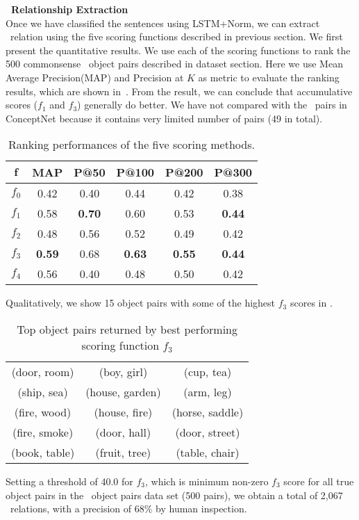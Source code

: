 \noindent
\textbf{\lnear\ Relationship Extraction}\\
Once we have classified the sentences using LSTM+Norm, we can extract \lnear\
relation using the five scoring functions described in previous section.
We first present the quantitative results. 
We use each of the scoring functions to 
rank the 500 commonsense \lnear\ object pairs described in dataset section. 
Here we use Mean Average Precision(MAP) and Precision at $K$ as metric 
to evaluate the ranking results, which are shown in~\tabref{tab:3m}.
From the result, we can conclude that accumulative scores ($f_1$ and $f_3$)
generally do better. We have not compared with the \lnear\ pairs in
ConceptNet because it contains very limited number of pairs (49 in total).
\begin{table}[th!]
\centering
\small
\begin{tabular}{|c|c|c|c|c|c|}
\hline
$\mathbf{f}$	& \textbf{MAP} & \textbf{P@50} & \textbf{P@100}  &  \textbf{P@200}& \textbf{P@300}\\ \hline \hline
	$f_0$ & 0.42 & 0.40 & 0.44 & 0.42 & 0.38 \\ \hline
	$f_1$	& 0.58  & {\bf 0.70} & 0.60& 0.53 & {\bf 0.44}\\\hline
	$f_2$	& 0.48 & 0.56 & 0.52  & 0.49 & 0.42\\\hline
	$f_3$	& {\bf 0.59} & 0.68& {\bf 0.63} & {\bf 0.55} & {\bf 0.44}\\\hline
	$f_4$	& 0.56 & 0.40 & 0.48 & 0.50 & 0.42\\\hline
	\end{tabular}
\caption{Ranking performances of the five scoring methods.}
\label{tab:3m}
\end{table}

Qualitatively, we show 15 object pairs with some of the highest $f_3$ scores
in \tabref{tbl:toppairs}.

\begin{table}[th]
	\centering
	\small
	\begin{tabular}{|ccc|}
		\hline
		(door, room)  & (boy, girl)     & (cup, tea)      \\
		(ship, sea)   & (house, garden) & (arm, leg)      \\
		(fire, wood)  & (house, fire)   & (horse, saddle) \\
		(fire, smoke) & (door, hall)    & (door, street)  \\
		(book, table) & (fruit, tree)   & (table, chair)  \\ \hline
	\end{tabular}
	\caption{Top object pairs returned by best performing scoring function $f_3$}
	\label{tbl:toppairs}
\end{table}

Setting a threshold of 40.0 for $f_3$, which is minimum non-zero
$f_3$ score for all true object pairs in the \lnear\ object pairs 
data set (500 pairs), we obtain a total of 2,067 \lnear\ relations, with
a precision of 68\% by human inspection.


